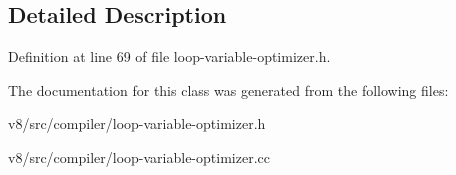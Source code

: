 \subsection{Detailed Description}


Definition at line 69 of file loop-\/variable-\/optimizer.\+h.



The documentation for this class was generated from the following files\+:\begin{DoxyCompactItemize}
\item 
v8/src/compiler/loop-\/variable-\/optimizer.\+h\item 
v8/src/compiler/loop-\/variable-\/optimizer.\+cc\end{DoxyCompactItemize}
